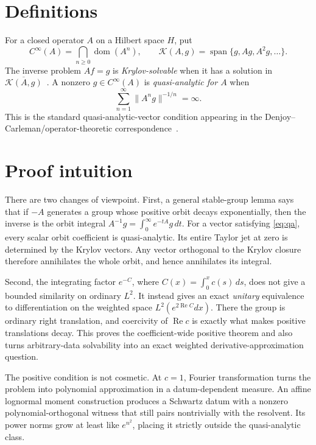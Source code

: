 \documentclass[11pt]{article}
\newcommand{\K}{\mathcal{K}}
\begin{document}
\section*{Definitions}

For a closed operator $A$ on a Hilbert space $H$, put
\[
 C^\infty(A)=\bigcap_{n\geq0}\operatorname{dom}(A^n),\qquad
 \K(A,g)=\operatorname{span}\{g,Ag,A^2g,\ldots\}.
\]
The inverse problem $Af=g$ is \emph{Krylov-solvable} when it has a solution in
$\overline{\K(A,g)}$~\cite{CMUnbounded,CMNBounded}.  A nonzero
$g\in C^\infty(A)$ is \emph{quasi-analytic for $A$} when
\begin{equation}\label{eq:qa}
 \sum_{n=1}^\infty \|A^n g\|^{-1/n}=\infty.
\end{equation}
This is the standard quasi-analytic-vector condition appearing in the
Denjoy--Carleman/operator-theoretic correspondence~\cite{Chernoff}.

\section*{Proof intuition}

There are two changes of viewpoint.  First, a general stable-group lemma says
that if $-A$ generates a group whose positive orbit decays exponentially,
then the inverse is the orbit integral
$A^{-1}g=\int_0^\infty e^{-tA}g\,dt$.  For a vector satisfying
\eqref{eq:qa}, every scalar orbit coefficient is quasi-analytic.  Its entire
Taylor jet at zero is determined by the Krylov vectors.  Any vector
orthogonal to the Krylov closure therefore annihilates the whole orbit, and
hence annihilates its integral.

Second, the integrating factor $e^{-C}$, where
$C(x)=\int_0^x c(s)\,ds$, does not give a bounded similarity on ordinary
$L^2$.  It instead gives an exact \emph{unitary} equivalence to differentiation
on the weighted space $L^2(e^{2\operatorname{Re}C}dx)$.  There the group is
ordinary right translation, and coercivity of $\operatorname{Re}c$ is exactly
what makes positive translations decay.  This proves the coefficient-wide
positive theorem and also turns arbitrary-data solvability into an exact
weighted derivative-approximation question.

The positive condition is not cosmetic.  At $c=1$, Fourier transformation
turns the problem into polynomial approximation in a datum-dependent measure.
An affine lognormal moment construction produces a Schwartz datum with a
nonzero polynomial-orthogonal witness that still pairs nontrivially with the
resolvent.  Its power norms grow at least like $e^{n^2}$, placing it strictly
outside the quasi-analytic class.
\end{document}
